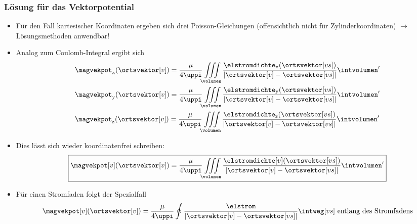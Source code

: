 \begin{frame}
  \frametitle{Lösung für das Vektorpotential}
  \begin{itemize}[<+->]
  \item Für den Fall \alert{kartesischer Koordinaten} ergeben sich drei Poisson-Gleichungen (offensichtlich nicht für Zylinderkoordinaten) $\to$ \alert{Lösungsmethoden anwendbar!}
    \item Analog zum Coulomb-Integral ergibt sich
\begin{align*}
	& \magvekpot_\mathrm{x}(\ortsvektor[v]) = \dfrac{\mu}{4 \uppi} \iiint\limits_{\volumen} \dfrac{\elstromdichte_\mathrm{x}(\ortsvektor[vs]) }{\left| \ortsvektor[v] - \ortsvektor[vs] \right|} \intvolumen' \\
	& \magvekpot_\mathrm{y}(\ortsvektor[v]) = \dfrac{\mu}{4 \uppi} \iiint\limits_{\volumen} \dfrac{\elstromdichte_\mathrm{y}(\ortsvektor[vs]) }{\left| \ortsvektor[v] - \ortsvektor[vs] \right|} \intvolumen' \\
	& \magvekpot_\mathrm{z}(\ortsvektor[v]) = \dfrac{\mu}{4 \uppi} \iiint\limits_{\volumen} \dfrac{\elstromdichte_\mathrm{z}(\ortsvektor[vs]) }{\left| \ortsvektor[v] - \ortsvektor[vs] \right|} \intvolumen'
\end{align*}
\item Dies lässt sich wieder \alert{koordinatenfrei} schreiben:
\begin{equation*}
	\boxed{\magvekpot[v](\ortsvektor[v]) = \dfrac{\mu}{4 \uppi} \iiint\limits_{\volumen} \dfrac{\elstromdichte[v](\ortsvektor[vs])}{\left| \ortsvektor[v] - \ortsvektor[vs] \right|} \intvolumen'} 
\end{equation*}
\item Für einen \alert{Stromfaden} folgt der Spezialfall
\begin{equation*}
	\magvekpot[v](\ortsvektor[v]) = \dfrac{\mu}{4 \uppi} \oint \dfrac{\elstrom}{\left| \ortsvektor[v] - \ortsvektor[vs] \right|} \intweg[vs] \text{ entlang des Stromfadens} 
      \end{equation*}
  \end{itemize}
\end{frame}

